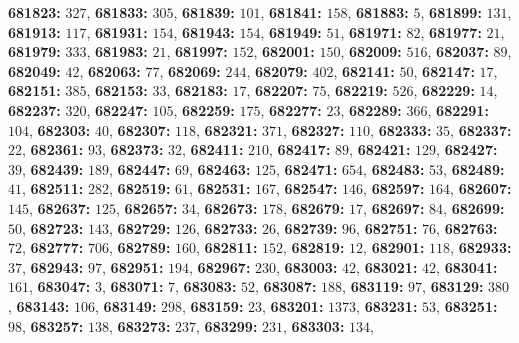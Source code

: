 \textsf{\bfseries 681823:} $327$, \textsf{\bfseries 681833:} $305$, \textsf{\bfseries 681839:} $101$, \textsf{\bfseries 681841:} $158$, \textsf{\bfseries 681883:} $5$, \textsf{\bfseries 681899:} $131$, \textsf{\bfseries 681913:} $117$, \textsf{\bfseries 681931:} $154$, \textsf{\bfseries 681943:} $154$, \textsf{\bfseries 681949:} $51$, \textsf{\bfseries 681971:} $82$, \textsf{\bfseries 681977:} $21$, \textsf{\bfseries 681979:} $333$, \textsf{\bfseries 681983:} $21$, \textsf{\bfseries 681997:} $152$, \textsf{\bfseries 682001:} $150$, \textsf{\bfseries 682009:} $516$, \textsf{\bfseries 682037:} $89$, \textsf{\bfseries 682049:} $42$, \textsf{\bfseries 682063:} $77$, \textsf{\bfseries 682069:} $244$, \textsf{\bfseries 682079:} $402$, \textsf{\bfseries 682141:} $50$, \textsf{\bfseries 682147:} $17$, \textsf{\bfseries 682151:} $385$, \textsf{\bfseries 682153:} $33$, \textsf{\bfseries 682183:} $17$, \textsf{\bfseries 682207:} $75$, \textsf{\bfseries 682219:} $526$, \textsf{\bfseries 682229:} $14$, \textsf{\bfseries 682237:} $320$, \textsf{\bfseries 682247:} $105$, \textsf{\bfseries 682259:} $175$, \textsf{\bfseries 682277:} $23$, \textsf{\bfseries 682289:} $366$, \textsf{\bfseries 682291:} $104$, \textsf{\bfseries 682303:} $40$, \textsf{\bfseries 682307:} $118$, \textsf{\bfseries 682321:} $371$, \textsf{\bfseries 682327:} $110$, \textsf{\bfseries 682333:} $35$, \textsf{\bfseries 682337:} $22$, \textsf{\bfseries 682361:} $93$, \textsf{\bfseries 682373:} $32$, \textsf{\bfseries 682411:} $210$, \textsf{\bfseries 682417:} $89$, \textsf{\bfseries 682421:} $129$, \textsf{\bfseries 682427:} $39$, \textsf{\bfseries 682439:} $189$, \textsf{\bfseries 682447:} $69$, \textsf{\bfseries 682463:} $125$, \textsf{\bfseries 682471:} $654$, \textsf{\bfseries 682483:} $53$, \textsf{\bfseries 682489:} $41$, \textsf{\bfseries 682511:} $282$, \textsf{\bfseries 682519:} $61$, \textsf{\bfseries 682531:} $167$, \textsf{\bfseries 682547:} $146$, \textsf{\bfseries 682597:} $164$, \textsf{\bfseries 682607:} $145$, \textsf{\bfseries 682637:} $125$, \textsf{\bfseries 682657:} $34$, \textsf{\bfseries 682673:} $178$, \textsf{\bfseries 682679:} $17$, \textsf{\bfseries 682697:} $84$, \textsf{\bfseries 682699:} $50$, \textsf{\bfseries 682723:} $143$, \textsf{\bfseries 682729:} $126$, \textsf{\bfseries 682733:} $26$, \textsf{\bfseries 682739:} $96$, \textsf{\bfseries 682751:} $76$, \textsf{\bfseries 682763:} $72$, \textsf{\bfseries 682777:} $706$, \textsf{\bfseries 682789:} $160$, \textsf{\bfseries 682811:} $152$, \textsf{\bfseries 682819:} $12$, \textsf{\bfseries 682901:} $118$, \textsf{\bfseries 682933:} $37$, \textsf{\bfseries 682943:} $97$, \textsf{\bfseries 682951:} $194$, \textsf{\bfseries 682967:} $230$, \textsf{\bfseries 683003:} $42$, \textsf{\bfseries 683021:} $42$, \textsf{\bfseries 683041:} $161$, \textsf{\bfseries 683047:} $3$, \textsf{\bfseries 683071:} $7$, \textsf{\bfseries 683083:} $52$, \textsf{\bfseries 683087:} $188$, \textsf{\bfseries 683119:} $97$, \textsf{\bfseries 683129:} $380$, \textsf{\bfseries 683143:} $106$, \textsf{\bfseries 683149:} $298$, \textsf{\bfseries 683159:} $23$, \textsf{\bfseries 683201:} $1373$, \textsf{\bfseries 683231:} $53$, \textsf{\bfseries 683251:} $98$, \textsf{\bfseries 683257:} $138$, \textsf{\bfseries 683273:} $237$, \textsf{\bfseries 683299:} $231$, \textsf{\bfseries 683303:} $134$, 
